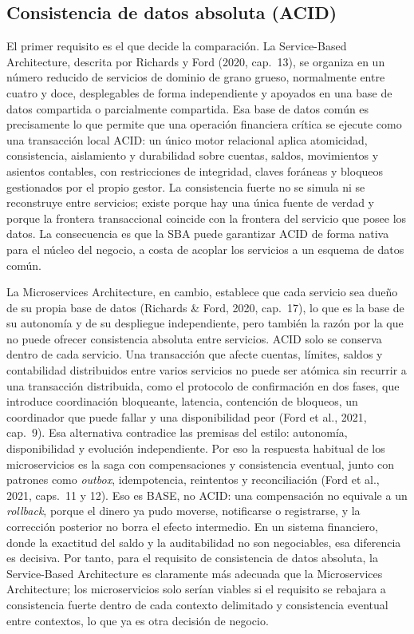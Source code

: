 \documentclass[12pt,a4paper]{article}
\begin{document}
\subsection{Consistencia de datos absoluta (ACID)}

El primer requisito es el que decide la comparación. La Service-Based Architecture, descrita por Richards y Ford (2020, cap.~13), se organiza en un número reducido de servicios de dominio de grano grueso, normalmente entre cuatro y doce, desplegables de forma independiente y apoyados en una base de datos compartida o parcialmente compartida. Esa base de datos común es precisamente lo que permite que una operación financiera crítica se ejecute como una transacción local ACID: un único motor relacional aplica atomicidad, consistencia, aislamiento y durabilidad sobre cuentas, saldos, movimientos y asientos contables, con restricciones de integridad, claves foráneas y bloqueos gestionados por el propio gestor. La consistencia fuerte no se simula ni se reconstruye entre servicios; existe porque hay una única fuente de verdad y porque la frontera transaccional coincide con la frontera del servicio que posee los datos. La consecuencia es que la SBA puede garantizar ACID de forma nativa para el núcleo del negocio, a costa de acoplar los servicios a un esquema de datos común.

La Microservices Architecture, en cambio, establece que cada servicio sea dueño de su propia base de datos (Richards \& Ford, 2020, cap.~17), lo que es la base de su autonomía y de su despliegue independiente, pero también la razón por la que no puede ofrecer consistencia absoluta entre servicios. ACID solo se conserva dentro de cada servicio. Una transacción que afecte cuentas, límites, saldos y contabilidad distribuidos entre varios servicios no puede ser atómica sin recurrir a una transacción distribuida, como el protocolo de confirmación en dos fases, que introduce coordinación bloqueante, latencia, contención de bloqueos, un coordinador que puede fallar y una disponibilidad peor (Ford et al., 2021, cap.~9). Esa alternativa contradice las premisas del estilo: autonomía, disponibilidad y evolución independiente. Por eso la respuesta habitual de los microservicios es la saga con compensaciones y consistencia eventual, junto con patrones como \emph{outbox}, idempotencia, reintentos y reconciliación (Ford et al., 2021, caps.~11 y 12). Eso es BASE, no ACID: una compensación no equivale a un \emph{rollback}, porque el dinero ya pudo moverse, notificarse o registrarse, y la corrección posterior no borra el efecto intermedio. En un sistema financiero, donde la exactitud del saldo y la auditabilidad no son negociables, esa diferencia es decisiva. Por tanto, para el requisito de consistencia de datos absoluta, la Service-Based Architecture es claramente más adecuada que la Microservices Architecture; los microservicios solo serían viables si el requisito se rebajara a consistencia fuerte dentro de cada contexto delimitado y consistencia eventual entre contextos, lo que ya es otra decisión de negocio.
\end{document}

